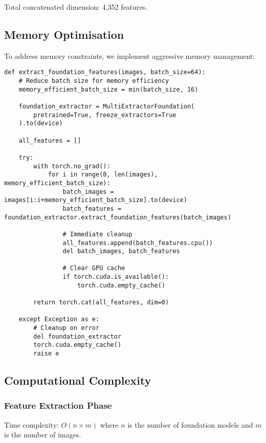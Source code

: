 \documentclass[11pt,a4paper]{article}
\begin{document}
Total concatenated dimension: 4,352 features.

\subsection{Memory Optimisation}

To address memory constraints, we implement aggressive memory management:

\begin{lstlisting}[caption=Memory-Efficient Feature Extraction]
def extract_foundation_features(images, batch_size=64):
    # Reduce batch size for memory efficiency
    memory_efficient_batch_size = min(batch_size, 16)
    
    foundation_extractor = MultiExtractorFoundation(
        pretrained=True, freeze_extractors=True
    ).to(device)
    
    all_features = []
    
    try:
        with torch.no_grad():
            for i in range(0, len(images), memory_efficient_batch_size):
                batch_images = images[i:i+memory_efficient_batch_size].to(device)
                batch_features = foundation_extractor.extract_foundation_features(batch_images)
                
                # Immediate cleanup
                all_features.append(batch_features.cpu())
                del batch_images, batch_features
                
                # Clear GPU cache
                if torch.cuda.is_available():
                    torch.cuda.empty_cache()
        
        return torch.cat(all_features, dim=0)
    
    except Exception as e:
        # Cleanup on error
        del foundation_extractor
        torch.cuda.empty_cache()
        raise e
\end{lstlisting}

\subsection{Computational Complexity}

\subsubsection{Feature Extraction Phase}
Time complexity: $O(n \times m)$ where $n$ is the number of foundation models and $m$ is the number of images.
\end{document}
